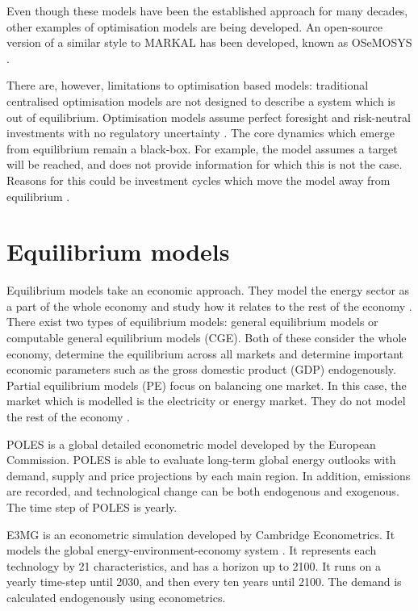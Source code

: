 Even though these models have been the established approach for many decades, other examples of optimisation models are being developed. An open-source version of a similar style to MARKAL has been developed, known as OSeMOSYS \cite{Howells2011}. 

There are, however, limitations to optimisation based models: traditional centralised optimisation models are not designed to describe a system which is out of equilibrium. Optimisation models assume perfect foresight and risk-neutral investments with no regulatory uncertainty \cite{Pfenninger2014}. The core dynamics which emerge from equilibrium remain a black-box. For example, the model assumes a target will be reached, and does not provide information for which this is not the case. Reasons for this could be investment cycles which move the model away from equilibrium \cite{Chappin2017}.


\section{Equilibrium models}
\label{sec:litreview:equilibrium}

Equilibrium models take an economic approach. They model the energy sector as a part of the whole economy and study how it relates to the rest of the economy \cite{Ringkjob2018}. There exist two types of equilibrium models: general equilibrium models or computable general equilibrium models (CGE). Both of these consider the whole economy, determine the equilibrium across all markets and determine important economic parameters such as the gross domestic product (GDP) endogenously. Partial equilibrium models (PE) focus on balancing one market. In this case, the market which is modelled is the electricity or energy market. They do not model the rest of the economy \cite{Ringkjob2018, Hall2016a}. 

POLES \cite{Soria2012} is a global detailed econometric model developed by the European Commission. POLES is able to evaluate long-term global energy outlooks with demand, supply and price projections by each main region. In addition,  emissions are recorded, and technological change can be both endogenous and exogenous. The time step of POLES is yearly.

E3MG is an econometric simulation developed by Cambridge Econometrics. It models the global energy-environment-economy system \cite{Dagoumas2010}. It represents each technology by 21 characteristics, and has a horizon up to 2100. It runs on a yearly time-step until 2030, and then every ten years until 2100. The demand is calculated endogenously using econometrics.

